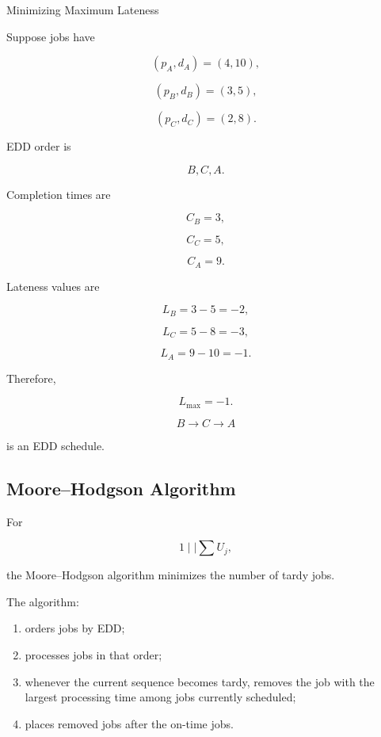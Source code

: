 \begin{workedexamplebox}{Minimizing Maximum Lateness}

Suppose jobs have

\[
(p_A,d_A)=(4,10),
\]

\[
(p_B,d_B)=(3,5),
\]

\[
(p_C,d_C)=(2,8).
\]

EDD order is

\[
B,C,A.
\]

Completion times are

\[
C_B=3,
\]

\[
C_C=5,
\]

\[
C_A=9.
\]

Lateness values are

\[
L_B=3-5=-2,
\]

\[
L_C=5-8=-3,
\]

\[
L_A=9-10=-1.
\]

Therefore,

\[
\boxed{
L_{\max}=-1.
}
\]

\begin{answerbox}
\[
\boxed{
B\to C\to A
}
\]

is an EDD schedule.
\end{answerbox}

\end{workedexamplebox}

\subsection{Moore--Hodgson Algorithm}
\label{subsec:moore-hodgson}

For

\[
\boxed{
1\mid\mid\sum U_j,
}
\]

the Moore--Hodgson algorithm minimizes the number of tardy jobs.

The algorithm:

\begin{enumerate}
    \item orders jobs by EDD;
    \item processes jobs in that order;
    \item whenever the current sequence becomes tardy, removes the job
          with the largest processing time among jobs currently scheduled;
    \item places removed jobs after the on-time jobs.
\end{enumerate}

